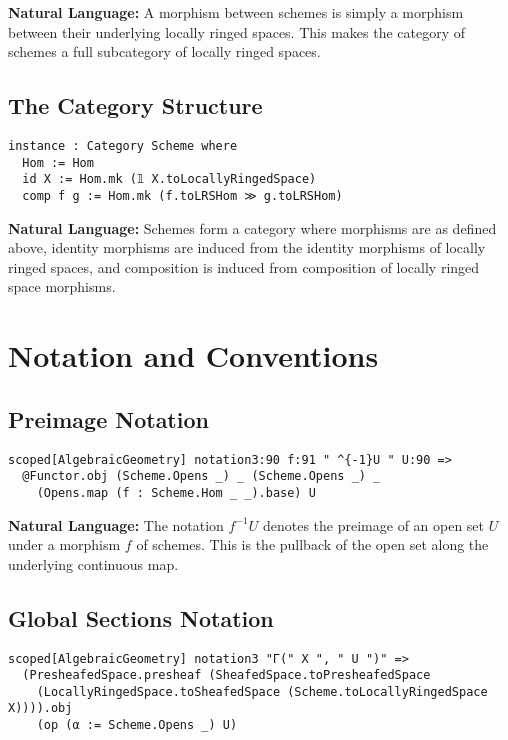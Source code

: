 \documentclass{article}
\theoremstyle{definition}
\begin{document}
\textbf{Natural Language:} A morphism between schemes is simply a morphism between their underlying locally ringed spaces. This makes the category of schemes a full subcategory of locally ringed spaces.

\subsection{The Category Structure}

\begin{lstlisting}
instance : Category Scheme where
  Hom := Hom
  id X := Hom.mk (𝟙 X.toLocallyRingedSpace)
  comp f g := Hom.mk (f.toLRSHom ≫ g.toLRSHom)
\end{lstlisting}

\textbf{Natural Language:} Schemes form a category where morphisms are as defined above, identity morphisms are induced from the identity morphisms of locally ringed spaces, and composition is induced from composition of locally ringed space morphisms.

\section{Notation and Conventions}

\subsection{Preimage Notation}

\begin{lstlisting}
scoped[AlgebraicGeometry] notation3:90 f:91 " ^{-1}U " U:90 =>
  @Functor.obj (Scheme.Opens _) _ (Scheme.Opens _) _
    (Opens.map (f : Scheme.Hom _ _).base) U
\end{lstlisting}

\textbf{Natural Language:} The notation $f^{-1}U$ denotes the preimage of an open set $U$ under a morphism $f$ of schemes. This is the pullback of the open set along the underlying continuous map.

\subsection{Global Sections Notation}

\begin{lstlisting}
scoped[AlgebraicGeometry] notation3 "Γ(" X ", " U ")" =>
  (PresheafedSpace.presheaf (SheafedSpace.toPresheafedSpace
    (LocallyRingedSpace.toSheafedSpace (Scheme.toLocallyRingedSpace X)))).obj
    (op (α := Scheme.Opens _) U)
\end{lstlisting}
\end{document}
